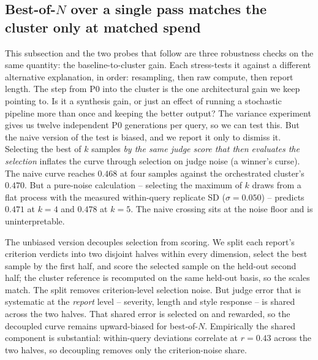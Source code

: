 \documentclass[11pt]{article}
\begin{document}
\subsection{Best-of-$N$ over a single pass matches the cluster only at matched spend}\label{sec:bestofn}
This subsection and the two probes that follow are three robustness checks on the same
quantity: the baseline-to-cluster gain. Each stress-tests it against a different
alternative explanation, in order: resampling, then raw compute, then report length. The
step from P0 into the cluster is the one architectural gain we keep pointing to. Is it a
synthesis gain, or just an effect of running a stochastic pipeline more than once and
keeping the better output? The variance experiment gives us twelve independent P0
generations per query, so we can test this. But the naive version of the test is biased,
and we report it only to dismiss it.
Selecting the best of $k$ samples \emph{by the same judge score that then evaluates the
selection} inflates the curve through selection on judge noise (a winner's curse). The
naive curve reaches $0.468$ at four samples against the orchestrated cluster's $0.470$.
But a pure-noise calculation -- selecting the maximum of $k$ draws from a flat process
with the measured within-query replicate SD ($\sigma{=}0.050$) -- predicts $0.471$ at
$k{=}4$ and $0.478$ at $k{=}5$. The naive crossing sits at the noise floor and is
uninterpretable.

The unbiased version decouples selection from scoring. We split each report's criterion
verdicts into two disjoint halves within every dimension, select the best sample by the
first half, and score the selected sample on the held-out second half; the cluster
reference is recomputed on the same held-out basis, so the scales match. The split
removes criterion-level selection noise. But judge error that is systematic at the
\emph{report} level -- severity, length and style response -- is shared across the two
halves. That shared error is selected on and rewarded, so the decoupled curve remains
upward-biased for best-of-$N$. Empirically the shared component is substantial:
within-query deviations correlate at $r{=}0.43$ across the two halves, so decoupling
removes only the criterion-noise share.
\end{document}
